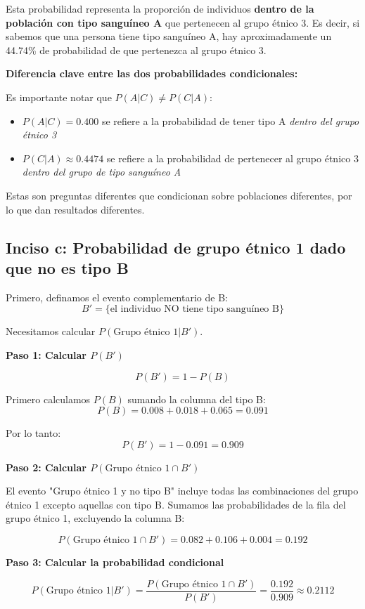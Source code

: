 \documentclass[a4paper]{article}
\begin{document}
Esta probabilidad representa la proporción de individuos \textbf{dentro de la población con tipo sanguíneo A} que pertenecen al grupo étnico 3. Es decir, si sabemos que una persona tiene tipo sanguíneo A, hay aproximadamente un 44.74\% de probabilidad de que pertenezca al grupo étnico 3.

\textbf{Diferencia clave entre las dos probabilidades condicionales:}

Es importante notar que $P(A|C) \neq P(C|A)$:
\begin{itemize}
    \item $P(A|C) = 0.400$ se refiere a la probabilidad de tener tipo A \textit{dentro del grupo étnico 3}
    \item $P(C|A) \approx 0.4474$ se refiere a la probabilidad de pertenecer al grupo étnico 3 \textit{dentro del grupo de tipo sanguíneo A}
\end{itemize}

Estas son preguntas diferentes que condicionan sobre poblaciones diferentes, por lo que dan resultados diferentes.

\subsection*{Inciso c: Probabilidad de grupo étnico 1 dado que no es tipo B}

Primero, definamos el evento complementario de B:
$$B' = \{\text{el individuo NO tiene tipo sanguíneo B}\}$$

Necesitamos calcular $P(\text{Grupo étnico 1} | B')$.

\textbf{Paso 1: Calcular $P(B')$}

$$P(B') = 1 - P(B)$$

Primero calculamos $P(B)$ sumando la columna del tipo B:
$$P(B) = 0.008 + 0.018 + 0.065 = 0.091$$

Por lo tanto:
$$P(B') = 1 - 0.091 = 0.909$$

\textbf{Paso 2: Calcular $P(\text{Grupo étnico 1} \cap B')$}

El evento "Grupo étnico 1 y no tipo B" incluye todas las combinaciones del grupo étnico 1 excepto aquellas con tipo B. Sumamos las probabilidades de la fila del grupo étnico 1, excluyendo la columna B:

$$P(\text{Grupo étnico 1} \cap B') = 0.082 + 0.106 + 0.004 = 0.192$$

\textbf{Paso 3: Calcular la probabilidad condicional}

$$P(\text{Grupo étnico 1} | B') = \frac{P(\text{Grupo étnico 1} \cap B')}{P(B')} = \frac{0.192}{0.909} \approx 0.2112$$
\end{document}
